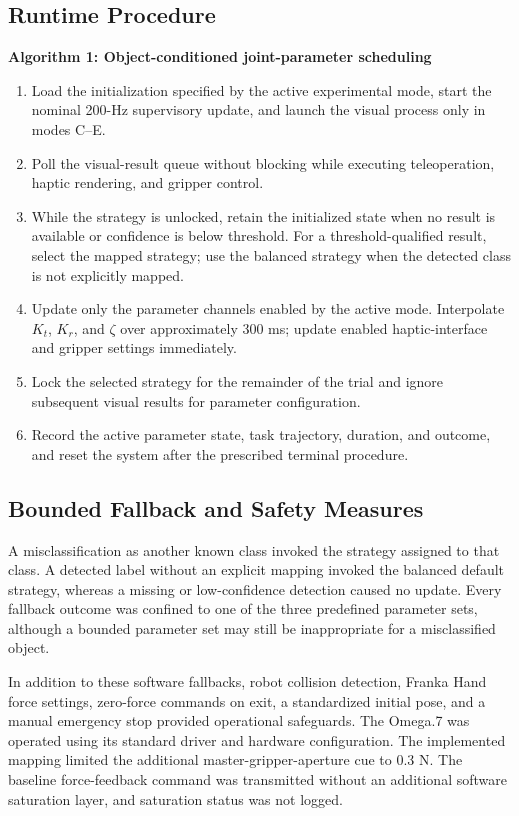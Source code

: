 \subsection{Runtime Procedure}
\textbf{Algorithm 1: Object-conditioned joint-parameter scheduling}

\begin{enumerate}
\item Load the initialization specified by the active experimental mode, start the nominal 200-Hz supervisory update, and launch the visual process only in modes C--E.
\item Poll the visual-result queue without blocking while executing teleoperation, haptic rendering, and gripper control.
\item While the strategy is unlocked, retain the initialized state when no result is available or confidence is below threshold. For a threshold-qualified result, select the mapped strategy; use the balanced strategy when the detected class is not explicitly mapped.
\item Update only the parameter channels enabled by the active mode. Interpolate $K_t$, $K_r$, and $\zeta$ over approximately 300 ms; update enabled haptic-interface and gripper settings immediately.
\item Lock the selected strategy for the remainder of the trial and ignore subsequent visual results for parameter configuration.
\item Record the active parameter state, task trajectory, duration, and outcome, and reset the system after the prescribed terminal procedure.
\end{enumerate}
\subsection{Bounded Fallback and Safety Measures}
A misclassification as another known class invoked the strategy assigned to that class. A detected label without an explicit mapping invoked the balanced default strategy, whereas a missing or low-confidence detection caused no update. Every fallback outcome was confined to one of the three predefined parameter sets, although a bounded parameter set may still be inappropriate for a misclassified object.

In addition to these software fallbacks, robot collision detection, Franka Hand force settings, zero-force commands on exit, a standardized initial pose, and a manual emergency stop provided operational safeguards. The Omega.7 was operated using its standard driver and hardware configuration. The implemented mapping limited the additional master-gripper-aperture cue to 0.3 N. The baseline force-feedback command was transmitted without an additional software saturation layer, and saturation status was not logged.

